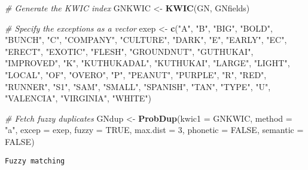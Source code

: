 \documentclass[
]{article}
\newenvironment{Shaded}{\begin{snugshade}}{\end{snugshade}}
\newcommand{\CommentTok}[1]{\textcolor[rgb]{0.56,0.35,0.01}{\textit{#1}}}
\newcommand{\DataTypeTok}[1]{\textcolor[rgb]{0.13,0.29,0.53}{#1}}
\newcommand{\DecValTok}[1]{\textcolor[rgb]{0.00,0.00,0.81}{#1}}
\newcommand{\KeywordTok}[1]{\textcolor[rgb]{0.13,0.29,0.53}{\textbf{#1}}}
\newcommand{\NormalTok}[1]{#1}
\newcommand{\OtherTok}[1]{\textcolor[rgb]{0.56,0.35,0.01}{#1}}
\newcommand{\StringTok}[1]{\textcolor[rgb]{0.31,0.60,0.02}{#1}}
\begin{document}
\begin{Shaded}
\begin{Highlighting}[]
\CommentTok{# Generate the KWIC index}
\NormalTok{GNKWIC <-}\StringTok{ }\KeywordTok{KWIC}\NormalTok{(GN, GNfields)}

\CommentTok{# Specify the exceptions as a vector}
\NormalTok{exep <-}\StringTok{ }\KeywordTok{c}\NormalTok{(}\StringTok{"A"}\NormalTok{, }\StringTok{"B"}\NormalTok{, }\StringTok{"BIG"}\NormalTok{, }\StringTok{"BOLD"}\NormalTok{, }\StringTok{"BUNCH"}\NormalTok{, }\StringTok{"C"}\NormalTok{, }\StringTok{"COMPANY"}\NormalTok{, }\StringTok{"CULTURE"}\NormalTok{,}
         \StringTok{"DARK"}\NormalTok{, }\StringTok{"E"}\NormalTok{, }\StringTok{"EARLY"}\NormalTok{, }\StringTok{"EC"}\NormalTok{, }\StringTok{"ERECT"}\NormalTok{, }\StringTok{"EXOTIC"}\NormalTok{, }\StringTok{"FLESH"}\NormalTok{, }\StringTok{"GROUNDNUT"}\NormalTok{,}
         \StringTok{"GUTHUKAI"}\NormalTok{, }\StringTok{"IMPROVED"}\NormalTok{, }\StringTok{"K"}\NormalTok{, }\StringTok{"KUTHUKADAL"}\NormalTok{, }\StringTok{"KUTHUKAI"}\NormalTok{, }\StringTok{"LARGE"}\NormalTok{,}
         \StringTok{"LIGHT"}\NormalTok{, }\StringTok{"LOCAL"}\NormalTok{, }\StringTok{"OF"}\NormalTok{, }\StringTok{"OVERO"}\NormalTok{, }\StringTok{"P"}\NormalTok{, }\StringTok{"PEANUT"}\NormalTok{, }\StringTok{"PURPLE"}\NormalTok{, }\StringTok{"R"}\NormalTok{,}
         \StringTok{"RED"}\NormalTok{, }\StringTok{"RUNNER"}\NormalTok{, }\StringTok{"S1"}\NormalTok{, }\StringTok{"SAM"}\NormalTok{, }\StringTok{"SMALL"}\NormalTok{, }\StringTok{"SPANISH"}\NormalTok{, }\StringTok{"TAN"}\NormalTok{, }\StringTok{"TYPE"}\NormalTok{,}
         \StringTok{"U"}\NormalTok{, }\StringTok{"VALENCIA"}\NormalTok{, }\StringTok{"VIRGINIA"}\NormalTok{, }\StringTok{"WHITE"}\NormalTok{)}

\CommentTok{# Fetch fuzzy duplicates}
\NormalTok{GNdup <-}\StringTok{ }\KeywordTok{ProbDup}\NormalTok{(}\DataTypeTok{kwic1 =}\NormalTok{ GNKWIC, }\DataTypeTok{method =} \StringTok{"a"}\NormalTok{, }\DataTypeTok{excep =}\NormalTok{ exep, }
                 \DataTypeTok{fuzzy =} \OtherTok{TRUE}\NormalTok{, }\DataTypeTok{max.dist =} \DecValTok{3}\NormalTok{,}
                 \DataTypeTok{phonetic =} \OtherTok{FALSE}\NormalTok{, }\DataTypeTok{semantic =} \OtherTok{FALSE}\NormalTok{)}
\end{Highlighting}
\end{Shaded}

\begin{verbatim}
Fuzzy matching
\end{verbatim}
\end{document}
